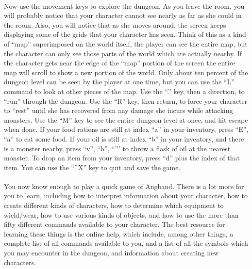 \paragraph{}Now use the movement keys to explore the dungeon. As you leave the
room, you will probably notice that your character cannot see nearly as
far as she could in the room. Also, you will notice that as she moves
around, the screen keeps displaying some of the grids that your
character has seen. Think of this as a kind of ``map'' superimposed on
the world itself, the player can see the entire map, but the character
can only see those parts of the world which are actually nearby. If the
character gets near the edge of the ``map'' portion of the screen the
entire map will scroll to show a new portion of the world. Only about
ten percent of the dungeon level can be seen by the player at one time,
but you can use the ``L'' command to look at other pieces of the map. Use
the ``.'' key, then a direction, to ``run'' through the dungeon. Use the
``R'' key, then return, to force your character to ``rest'' until she has
recovered from any damage she incurs while attacking monsters. Use the
``M'' key to see the entire dungeon level at once, and hit escape when
done. If your food rations are still at index ``a'' in your inventory,
press ``E'', ``a'' to eat some food. If your oil is still at index ``b'' in
your inventory, and there is a monster nearby, press ``v'', ``b'', ``''' to
throw a flask of oil at the nearest monster. To drop an item from your
inventory, press ``d'' plus the index of that item. You can use the
``\^{}X'' key to quit and save the game.

\paragraph{}You now know enough to play a quick game of Angband. There is a lot
more for you to learn, including how to interpret information about your
character, how to create different kinds of characters, how to determine
which equipment to wield/wear, how to use various kinds of objects, and
how to use the more than fifty different commands available to your
character. The best resource for learning these things is the online
help, which include, among other things, a complete list of all commands
available to you, and a list of all the symbols which you may encounter
in the dungeon, and information about creating new characters.

